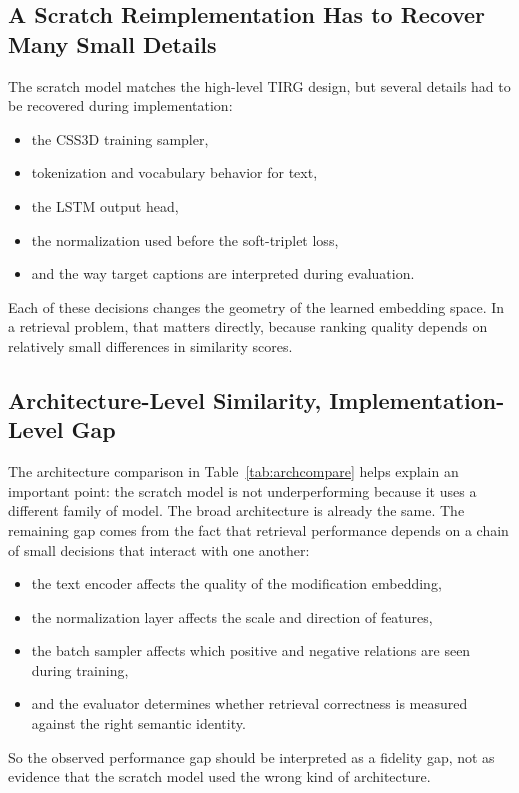 \documentclass[11pt]{article}
\begin{document}
\subsection{A Scratch Reimplementation Has to Recover Many Small Details}
The scratch model matches the high-level TIRG design, but several details had to be recovered during implementation:
\begin{itemize}[leftmargin=*]
  \item the CSS3D training sampler,
  \item tokenization and vocabulary behavior for text,
  \item the LSTM output head,
  \item the normalization used before the soft-triplet loss,
  \item and the way target captions are interpreted during evaluation.
\end{itemize}

Each of these decisions changes the geometry of the learned embedding space. In a retrieval problem, that matters directly, because ranking quality depends on relatively small differences in similarity scores.

\subsection{Architecture-Level Similarity, Implementation-Level Gap}
The architecture comparison in Table~\ref{tab:archcompare} helps explain an important point: the scratch model is not underperforming because it uses a different family of model. The broad architecture is already the same. The remaining gap comes from the fact that retrieval performance depends on a chain of small decisions that interact with one another:
\begin{itemize}[leftmargin=*]
  \item the text encoder affects the quality of the modification embedding,
  \item the normalization layer affects the scale and direction of features,
  \item the batch sampler affects which positive and negative relations are seen during training,
  \item and the evaluator determines whether retrieval correctness is measured against the right semantic identity.
\end{itemize}

So the observed performance gap should be interpreted as a fidelity gap, not as evidence that the scratch model used the wrong kind of architecture.
\end{document}

